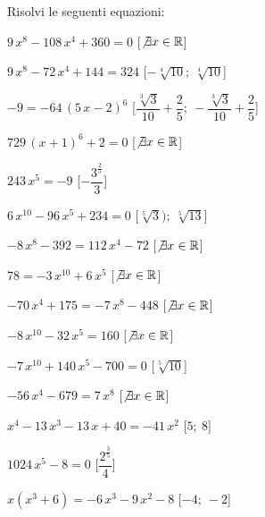 \begin{esercizio}\label{ese:03.1}
Risolvi le seguenti equazioni:
\begin{enumeratea}
\item \(9\,{x}^{8}-108\,{x}^{4}+360=0\) 
\hfill [\(\not\exists x \in \mathbb{R}\)]
\item \(9\,{x}^{8}-72\,{x}^{4}+144=324\) 
\hfill [\(-\sqrt [4]{10};~\sqrt [4]{10}\)]
\item \(-9=-64\, \left( 5\,x-2 \right) ^{6}\) 
\hfill [\({\dfrac{\sqrt [3]{3}}{10}}+{\dfrac{2}{5}};~-{\dfrac
{\sqrt [3]{3}}{10}}+{\dfrac{2}{5}}\)]
\item \(729\, \left( x+1 \right) ^{6}+2=0\) 
\hfill [\(\not\exists x \in \mathbb{R}\)]
\item \(243\,{x}^{5}=-9\) 
\hfill [\(-{\dfrac{{3}^{{\frac{2}{5}}}}{3}}\)]
\item \(6\,{x}^{10}-96\,{x}^{5}+234=0\) 
\hfill [\(\sqrt [5]{3});~\sqrt [5]{13}\)]
\item \(-8\,{x}^{8}-392=112\,{x}^{4}-72\) 
\hfill [\(\not\exists x \in \mathbb{R}\)]
\item \(78=-3\,{x}^{10}+6\,{x}^{5}\) 
\hfill [\(\not\exists x \in \mathbb{R}\)]
\item \(-70\,{x}^{4}+175=-7\,{x}^{8}-448\) 
\hfill [\(\not\exists x \in \mathbb{R}\)]
\item \(-8\,{x}^{10}-32\,{x}^{5}=160\) 
\hfill [\(\not\exists x \in \mathbb{R}\)]
\item \(-7\,{x}^{10}+140\,{x}^{5}-700=0\) 
\hfill [\(\sqrt[5]{10}\)]
\item \(-56\,{x}^{4}-679=7\,{x}^{8}\) 
\hfill [\(\not\exists x \in \mathbb{R}\)]
\item \({x}^{4}-13\,{x}^{3}-13\,x+40=-41\,{x}^{2}\) 
\hfill [\(5;~8\)]
\item \(1024\,{x}^{5}-8=0\) 
\hfill [\(\dfrac{{2}^{\frac{3}{5}}}{4}\)]
\item \(x \left( {x}^{3}+6 \right) =-6\,{x}^{3}-9\,{x}^{2}-8\) 
\hfill [\(-4;~-2\)]

\end{enumeratea}
\end{esercizio}
